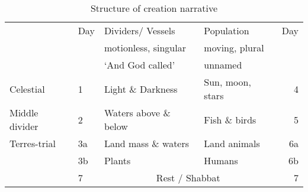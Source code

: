 \begin{table}[h]
\centering
\caption{Structure of creation narrative}
\small

\begin{tabularx}{0.45\textwidth}{m{1.3cm}l XX r}
\toprule
& Day & Dividers/ Vessels       & Population     & Day \\
&     & motionless, singular   & moving, plural & \\
&     & `And God called'       & unnamed        & \\
\toprule
Celestial      & 1 & Light \& Darkness     & Sun, moon, stars & 4 \\
Middle divider & 2 & Waters above \& below & Fish \& birds    & 5 \\
Terres-trial    & 3a & Land mass \& waters  & Land animals     & 6a \\
               & 3b & Plants               & Humans           & 6b \\
\midrule
               & 7 & \multicolumn{2}{c}{Rest / Shabbat} & 7 \\
\bottomrule
\end{tabularx}
\label{tab:creation}
\end{table}